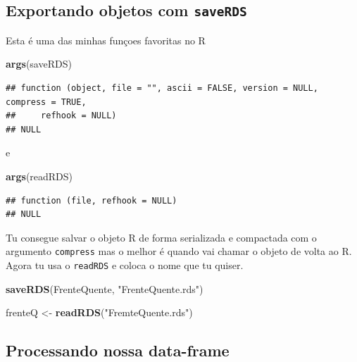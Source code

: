 \documentclass[]{book}
\newenvironment{Shaded}{\begin{snugshade}}{\end{snugshade}}
\newcommand{\KeywordTok}[1]{\textcolor[rgb]{0.13,0.29,0.53}{\textbf{#1}}}
\newcommand{\StringTok}[1]{\textcolor[rgb]{0.31,0.60,0.02}{#1}}
\newcommand{\NormalTok}[1]{#1}
\theoremstyle{definition}
\theoremstyle{definition}
\theoremstyle{definition}
\theoremstyle{remark}
\begin{document}
\subsection{\texorpdfstring{Exportando objetos com
\texttt{saveRDS}}{Exportando objetos com saveRDS}}\label{exportando-objetos-com-saverds}

Esta é uma das minhas funçoes favoritas no R

\begin{Shaded}
\begin{Highlighting}[]
\KeywordTok{args}\NormalTok{(saveRDS)}
\end{Highlighting}
\end{Shaded}

\begin{verbatim}
## function (object, file = "", ascii = FALSE, version = NULL, compress = TRUE, 
##     refhook = NULL) 
## NULL
\end{verbatim}

e

\begin{Shaded}
\begin{Highlighting}[]
\KeywordTok{args}\NormalTok{(readRDS)}
\end{Highlighting}
\end{Shaded}

\begin{verbatim}
## function (file, refhook = NULL) 
## NULL
\end{verbatim}

Tu consegue salvar o objeto R de forma serializada e compactada com o
argumento \texttt{compress} mas o melhor é quando vai chamar o objeto de
volta ao R. Agora tu usa o \texttt{readRDS} e coloca o nome que tu
quiser.

\begin{Shaded}
\begin{Highlighting}[]
\KeywordTok{saveRDS}\NormalTok{(FrenteQuente, }\StringTok{"FrenteQuente.rds"}\NormalTok{)}
\end{Highlighting}
\end{Shaded}

\begin{Shaded}
\begin{Highlighting}[]
\NormalTok{frenteQ <-}\StringTok{ }\KeywordTok{readRDS}\NormalTok{(}\StringTok{"FremteQuente.rds"}\NormalTok{)}
\end{Highlighting}
\end{Shaded}

\hypertarget{processing_dfs}{\subsection{Processando nossa
data-frame}\label{processing_dfs}}
\end{document}
